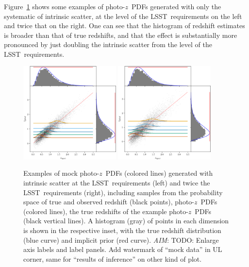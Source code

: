 \documentclass[iop]{emulateapj}
\newcommand{\todo}[3]{{\color{#2}\emph{#1}: #3}}
\newcommand{\aim}[1]{\todo{AIM}{red}{#1}}
\newcommand{\Fig}[1]{Figure~\ref{#1}}
\newcommand{\project}[1]{\textsc{#1}}
\newcommand{\lsst}{\project{LSST}}
\newcommand{\pz}{photo-$z$}
\newcommand{\pzpdf}{\pz\ PDF}%
\begin{document}
\Fig{fig:pzs-scatter} shows some examples of \pzpdf s generated with only the systematic of intrinsic scatter, at the level of the \lsst\ requirements on the left and twice that on the right.
One can see that the histogram of redshift estimates is broader than that of true redshifts, and that the effect is substantially more pronounced by just doubling the intrinsic scatter from the level of the \lsst\ requirements.

\begin{figure}
	\begin{center}
	\includegraphics[width=0.45\textwidth]{figures/chippr/samplepzs_scatter1.png}
	\includegraphics[width=0.45\textwidth]{figures/chippr/samplepzs_scatter2.png}
	\caption{
		Examples of mock \pzpdf s (colored lines) generated with intrinsic scatter at the \lsst\ requirements (left) and twice the \lsst\ requirements (right), including samples from the probability space of true and observed redshift (black points), \pzpdf s (colored lines), the true redshifts of the example \pzpdf s (black vertical lines).
		A histogram (gray) of points in each dimension is shown in the respective inset, with the true redshift distribution (blue curve) and implicit prior (red curve).
		\aim{TODO: Enlarge axis labels and label panels.
		Add watermark of ``mock data'' in UL corner, same for ``results of inference'' on other kind of plot.}
	}
	\label{fig:pzs-scatter}
	\end{center}
\end{figure}
\end{document}
